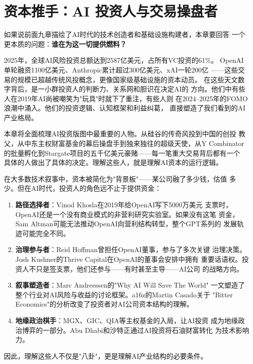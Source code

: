 
\chapter{资本推手：AI 投资人与交易操盘者}
\label{ch:investors}


如果说前面九章描绘了AI时代的技术创造者和基础设施构建者，本章要回答
一个更本质的问题：\textbf{谁在为这一切提供燃料？}

2025年，全球AI风险投资总额达到2587亿美元，占所有VC投资的61\%。
OpenAI单轮融资1100亿美元、Anthropic累计超过300亿美元、xAI一轮200亿
——这些交易的规模已超越传统风投概念，更像国家级基础设施的资本动员。
在这些天文数字背后，是一小群投资人的判断力、关系网和胆识在决定AI的
方向。他们中有些人在2019年AI尚被嘲笑为"玩具"时就下了重注，有些人则
在2024--2025年的FOMO浪潮中涌入。他们的投资逻辑、认知框架和利益纠葛，
直接塑造了我们看到的AI产业格局。

本章将全面梳理AI投资版图中最重要的人物。从硅谷的传奇风投到中国的创投
教父，从中东主权财富基金的幕后操盘手到独来独往的超级天使，从Y Combinator
的批量孵化到Stargate项目的五千亿美元豪赌——每一笔重大交易背后都有一个
具体的人做出了具体的决定。理解这些人，就是理解AI资本的运行逻辑。

\begin{whybox}[为什么AI投资人值得单独一章？]
在大多数技术叙事中，资本被简化为"背景板"——某公司融了多少钱，估值
多少。但在AI时代，投资人的角色远不止于提供资金：
\begin{enumerate}
  \item \textbf{路径选择者}：Vinod Khosla在2019年给OpenAI写下5000万美元
    支票时，OpenAI还是一个没有商业模式的非营利研究实验室。如果没有这笔
    资金，Sam Altman可能无法推动OpenAI向营利结构转型，整个GPT系列的
    发展轨迹可能完全不同。
  \item \textbf{治理参与者}：Reid Hoffman曾担任OpenAI董事，参与了多次关键
    治理决策。Josh Kushner的Thrive Capital在OpenAI的董事会安排中拥有
    重要话语权。投资人不只是签支票，他们还参与——有时甚至主导——AI公司
    的战略方向。
  \item \textbf{叙事塑造者}：Marc Andreessen的"Why AI Will Save The World"
    一文塑造了整个行业对AI风险与收益的讨论框架。a16z的Martin Casado关于
    "Bitter Economics"的分析改变了投资者对AI公司资本结构的理解。
  \item \textbf{地缘政治棋手}：MGX、GIC、QIA等主权基金的入局，让AI投资
    成为地缘政治博弈的一部分。Abu Dhabi和沙特正通过AI投资将石油财富转化
    为技术影响力。
\end{enumerate}
因此，理解这些人不仅是"八卦"，更是理解AI产业结构的必要条件。
\end{whybox}


